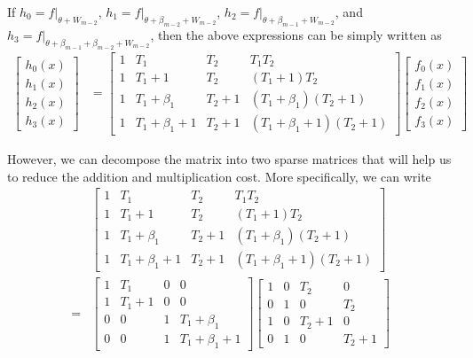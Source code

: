 \documentclass[11pt,runningheads]{llncs}
\begin{document}
If $h_0 = f\big|_{\theta+W_{m-2}}$, $h_1 = f\big|_{\theta+\beta_{m-2}+W_{m-2}}$, $h_2=f\big|_{\theta+\beta_{m-1}+W_{m-2}}$, and $h_3=f\big|_{\theta+\beta_{m-1}+\beta_{m-2}+W_{m-2}}$, then the above expressions can be simply written as
\begin{equation*}
    \begin{aligned}
        \begin{bmatrix}
            h_0(x)\\h_1(x)\\h_2(x)\\h_3(x)
        \end{bmatrix} &=
        \begin{bmatrix}
            1 & T_1 & T_2 & T_1 T_2\\
            1 & T_1+1 & T_2 & (T_1+1)T_2\\
            1 & T_1+\beta_1 & T_2+1 & (T_1+\beta_1)(T_2+1)\\
            1 & T_1+\beta_1+1 & T_2+1 & (T_1+\beta_1+1)(T_2+1)
        \end{bmatrix}
        \begin{bmatrix}
            f_0(x)\\f_1(x)\\f_2(x)\\f_3(x)
        \end{bmatrix}
    \end{aligned}
\end{equation*}

However, we can decompose the matrix into two sparse matrices that will help us to reduce the addition and multiplication cost. More specifically, we can write
\begin{equation*}
    \begin{aligned}
        &
       \begin{bmatrix}
            1 & T_1 & T_2 & T_1 T_2\\
            1 & T_1+1 & T_2 & (T_1+1)T_2\\
            1 & T_1+\beta_1 & T_2+1 & (T_1+\beta_1)(T_2+1)\\
            1 & T_1+\beta_1+1 & T_2+1 & (T_1+\beta_1+1)(T_2+1)
        \end{bmatrix}\\
        =& 
        \begin{bmatrix}
            1 & T_1 & 0 & 0\\
            1 & T_1+1 & 0 & 0\\
            0 & 0 & 1 & T_1+\beta_1\\
            0 & 0 & 1 & T_1+\beta_1+1
        \end{bmatrix}
        \begin{bmatrix}
            1 & 0 & T_2 & 0\\
            0 & 1 & 0 & T_2\\
            1 & 0 & T_2+1 & 0\\
            0 & 1 & 0 & T_2+1
        \end{bmatrix}
    \end{aligned}
\end{equation*}
\end{document}
